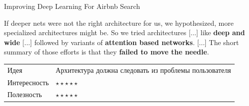 \documentclass[11pt,aspectratio=169,handout]{beamer}
\begin{document}
\begin{frame}{Improving Deep Learning For Airbnb Search \cite{AIRBNB2}}

\begin{tcolorbox}[colback=warn!5,colframe=warn!80,title=]
If deeper nets were not the right architecture for us, we hypothesized, more specialized architectures might be. 
So we tried architectures [...] like {\bf deep and wide} [...] followed by variants of {\bf attention based networks}. 
[...] The short summary of those efforts is that they {\bf failed to move the needle}.
\end{tcolorbox}

\vfill
\begin{small}
\begin{tabular}{l l}
Идея & Архитектура должна следовать из проблемы пользователя \\
Интересность & $\star\star\star\star\star$ \\
Полезность & $\star\star\star\star\star$
\end{tabular}
\end{small}

\end{frame}
\end{document}
